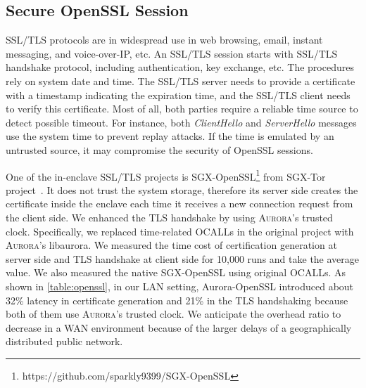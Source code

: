 \documentclass[journal,twocolumn,letterpaper,10pt]{IEEEtran}
\begin{document}
\subsection{Secure OpenSSL Session}\label{openssl}

SSL/TLS protocols are in widespread use in web browsing, email, instant messaging, and voice-over-IP, etc. 
An SSL/TLS session starts with SSL/TLS handshake protocol, including authentication, key exchange, etc. The procedures rely on system date and time. The SSL/TLS server needs to provide a certificate with a timestamp indicating the expiration time, and the SSL/TLS client needs to verify this certificate. Most of all, both parties require a reliable time source to detect possible timeout. For instance, both \emph{ClientHello} and \emph{ServerHello} messages use the system time to prevent replay attacks. If the time is emulated by an untrusted source, it may compromise the security of OpenSSL sessions.

One of the in-enclave SSL/TLS projects is SGX-OpenSSL\footnote{https://github.com/sparkly9399/SGX-OpenSSL} from SGX-Tor project~\cite{DBLP:conf/nsdi/KimHHKH17}. It does not trust the system storage, therefore its server side creates the certificate inside the enclave each time it receives a new connection request from the client side. We enhanced the TLS handshake by using \textsc{Aurora}'s trusted clock. Specifically, we replaced time-related OCALLs in the original project with \textsc{Aurora}'s libaurora. %
We measured the time cost of certification generation at server side and TLS handshake at client side for 10,000 runs and take the average value. We also measured the native SGX-OpenSSL using original OCALLs. As shown in \autoref{table:openssl}, in our LAN setting, Aurora-OpenSSL introduced about 32\% latency in certificate generation and 21\% in the TLS handshaking because both of them use \textsc{Aurora}'s trusted clock. We anticipate the overhead ratio to decrease in a WAN environment because of the larger delays of a geographically distributed public network.
\end{document}
